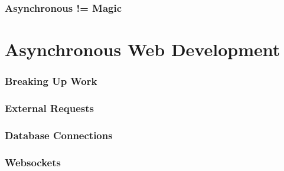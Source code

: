 \documentclass{beamer}
\begin{document}
\begin{frame}
\frametitle{Asynchronous != Magic}
\end{frame}


\section{Asynchronous Web Development}
\begin{frame}
\frametitle{Breaking Up Work}
\end{frame}


\begin{frame}
\frametitle{External Requests}
\end{frame}


\begin{frame}
\frametitle{Database Connections}
\end{frame}


\begin{frame}
\frametitle{Websockets}
\end{frame}
\end{document}
